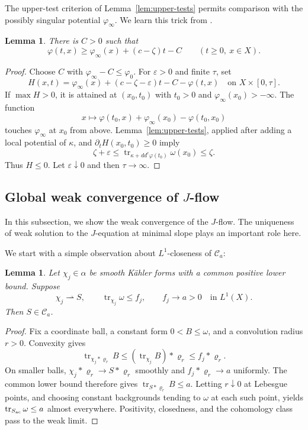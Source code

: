 \documentclass[reqno]{amsart}
\numberwithin{equation}{section}
\newtheorem{lemma}[theorem]{Lemma}
\theoremstyle{definition}
\DeclareMathOperator{\tr}{tr}
\newcommand{\ddc}{dd^c}
\newcommand{\cC}{\mathcal C}
\begin{document}
The upper-test criterion of Lemma~\ref{lem:upper-tests} permits comparison
with the possibly singular potential $\varphi_\infty$. We learn this trick from \cite{FLSW14}.
\begin{lemma}\label{lem:flow-comparison}
There is $C>0$ such that
\begin{equation}\label{eq:flow-comparison}
 \varphi(t,x)\ge\varphi_\infty(x)+(c-\zeta)t-C
 \qquad(t\ge0,\ x\in X).
\end{equation}
\end{lemma}
\begin{proof}
Choose $C$ with $\varphi_\infty-C\le\varphi_0$. For $\varepsilon>0$ and
finite $\tau$, set
\[
 H(x,t)=\varphi_\infty(x)+(c-\zeta-\varepsilon)t-C-\varphi(t,x)
 \quad\text{on }X\times[0,\tau].
\]
If $\max H>0$, it is attained at $(x_0,t_0)$ with $t_0>0$ and
$\varphi_\infty(x_0)>-\infty$. The function
\[
 x\longmapsto\varphi(t_0,x)+\varphi_\infty(x_0)-\varphi(t_0,x_0)
\]
touches  $\varphi_\infty$ at $x_0$ from above. Lemma~\ref{lem:upper-tests},
applied after adding a local potential of $\kappa$, and
$\partial_tH(x_0,t_0)\ge0$ imply
\[
 \zeta+\varepsilon
 \le\tr_{\kappa+\ddc\varphi(t_0)}\omega(x_0)\le\zeta.
\]
Thus $H\le0$. Let $\varepsilon\downarrow0$ and then $\tau\to\infty$.
\end{proof}

\subsection{Global weak convergence of $J$-flow }
In this subsection, we show the weak convergence of the $J$-flow. The uniqueness of weak solution to the $J$-equation at minimal slope plays an important role here. 

We start with a simple observation about $L^1$-closeness of $\cC_a$:
\begin{lemma}\label{lem:trace-closure}
Let $\chi_j\in\alpha$ be smooth K\"ahler forms with a common positive
lower bound. Suppose
\[
 \chi_j\rightharpoonup S,\qquad
 \tr_{\chi_j}\omega\le f_j,\qquad
 f_j\longrightarrow a>0\quad\text{in }L^1(X).
\]
Then $S\in\mathcal C_a$.
\end{lemma}
\begin{proof}
Fix a coordinate ball, a constant form $0<B\le\omega$, and a convolution
radius $r>0$. Convexity gives
\begin{equation}\label{eq:trace-closure}
 \tr_{\chi_j*\varrho_r}B
 \le(\tr_{\chi_j}B)*\varrho_r\le f_j*\varrho_r.
\end{equation}
On smaller balls, $\chi_j*\varrho_r\to S*\varrho_r$ smoothly and
$f_j*\varrho_r\to a$ uniformly. The common lower bound therefore gives
$\tr_{S*\varrho_r}B\le a$. Letting $r\downarrow0$ at Lebesgue points,
and choosing constant backgrounds tending to $\omega$ at each such
point, yields $\tr_{S_{\rm ac}}\omega\le a$ almost everywhere.
Positivity, closedness, and the cohomology class pass to the weak limit.
\end{proof}
\end{document}
